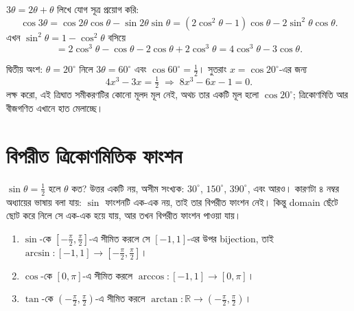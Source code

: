 \documentclass[11pt]{article}
\begin{document}
\begin{sol}
$3\theta = 2\theta + \theta$ লিখে যোগ সূত্র প্রয়োগ করি:
\[
  \cos 3\theta = \cos 2\theta\cos\theta - \sin 2\theta\sin\theta
  = \left( 2\cos^{2}\theta - 1 \right)\cos\theta
    - 2\sin^{2}\theta\cos\theta .
\]
এখন $\sin^{2}\theta = 1 - \cos^{2}\theta$ বসিয়ে
\[
  = 2\cos^{3}\theta - \cos\theta - 2\cos\theta + 2\cos^{3}\theta
  = 4\cos^{3}\theta - 3\cos\theta .
\]

দ্বিতীয় অংশ: $\theta = 20^{\circ}$ নিলে $3\theta = 60^{\circ}$ এবং
$\cos 60^{\circ} = \tfrac{1}{2}$। সুতরাং $x = \cos 20^{\circ}$-এর জন্য
\[
  4x^{3} - 3x = \tfrac{1}{2}
  \;\Longrightarrow\; 8x^{3} - 6x - 1 = 0 .
\]
লক্ষ করো, এই ত্রিঘাত সমীকরণটির কোনো মূলদ মূল নেই, অথচ তার একটি মূল হলো
$\cos 20^{\circ}$; ত্রিকোণমিতি আর বীজগণিত এখানে হাত মেলাচ্ছে।
\end{sol}

\section{বিপরীত ত্রিকোণমিতিক ফাংশন}

$\sin\theta = \tfrac{1}{2}$ হলে $\theta$ কত? উত্তর একটি নয়, অসীম সংখ্যক:
$30^{\circ}$, $150^{\circ}$, $390^{\circ}$, এবং আরও। কারণটা ৪ নম্বর অধ্যায়ের
ভাষায় বলা যায়: $\sin$ ফাংশনটি এক-এক নয়, তাই তার বিপরীত ফাংশন নেই। কিন্তু
domain ছেঁটে ছোট করে নিলে সে এক-এক হয়ে যায়, আর তখন বিপরীত ফাংশন পাওয়া যায়।

\begin{idea}[মূল পরিসর ও বিপরীত ফাংশন]
\begin{enumerate}
  \item $\sin$-কে $\left[ -\tfrac{\pi}{2}, \tfrac{\pi}{2} \right]$-এ সীমিত
        করলে সে $[-1,1]$-এর উপর bijection, তাই
        $\arcsin \colon [-1,1] \to \left[ -\tfrac{\pi}{2}, \tfrac{\pi}{2} \right]$।
  \item $\cos$-কে $[0, \pi]$-এ সীমিত করলে
        $\arccos \colon [-1,1] \to [0,\pi]$।
  \item $\tan$-কে $\left( -\tfrac{\pi}{2}, \tfrac{\pi}{2} \right)$-এ সীমিত
        করলে $\arctan \colon \mathbb{R} \to
        \left( -\tfrac{\pi}{2}, \tfrac{\pi}{2} \right)$।
\end{enumerate}
\end{idea}
\end{document}
